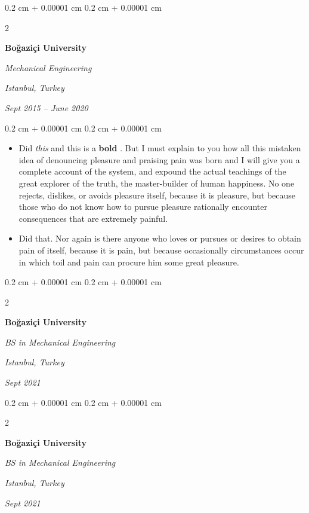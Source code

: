 \documentclass[10pt, letterpaper]{article}
\newenvironment{highlights}{
    \begin{itemize}[
        topsep=0.10 cm,
        parsep=0.10 cm,
        partopsep=0pt,
        itemsep=0pt,
        leftmargin=0.4 cm + 10pt
    ]
}{
    \end{itemize}
} %
\newenvironment{onecolentry}{
    \begin{adjustwidth}{
        0.2 cm + 0.00001 cm
    }{
        0.2 cm + 0.00001 cm
    }
}{
    \end{adjustwidth}
} %
\newenvironment{twocolentry}[2][]{
    \onecolentry
    \def\secondColumn{#2}
    \setcolumnwidth{\fill, 4.5 cm}
    \begin{paracol}{2}
}{
    \switchcolumn \raggedleft \secondColumn
    \end{paracol}
    \endonecolentry
} %
\let\hrefWithoutArrow\href
\renewcommand{\href}[2]{\hrefWithoutArrow{#1}{\ifthenelse{\equal{#2}{}}{ }{#2 }\raisebox{.15ex}{\footnotesize \faExternalLink*}}}
\begin{document}
        \vspace{0.2 cm}

        \begin{twocolentry}{
        \textit{Istanbul, Turkey}    
            
        \textit{Sept 2015 – June 2020}}
            \textbf{Boğaziçi University}

            \textit{Mechanical Engineering}
        \end{twocolentry}

        \vspace{0.10 cm}
        \begin{onecolentry}
            \begin{highlights}
                \item Did \textit{this} and this is a \textbf{bold} \href{https://example.com}{link}. But I must explain to you how all this mistaken idea of denouncing pleasure and praising pain was born and I will give you a complete account of the system, and expound the actual teachings of the great explorer of the truth, the master-builder of human happiness. No one rejects, dislikes, or avoids pleasure itself, because it is pleasure, but because those who do not know how to pursue pleasure rationally encounter consequences that are extremely painful.
                \item Did that. Nor again is there anyone who loves or pursues or desires to obtain pain of itself, because it is pain, but because occasionally circumstances occur in which toil and pain can procure him some great pleasure.
            \end{highlights}
        \end{onecolentry}


        \vspace{0.2 cm}

        \begin{twocolentry}{
        \textit{Istanbul, Turkey}    
            
        \textit{Sept 2021}}
            \textbf{Boğaziçi University}

            \textit{BS in Mechanical Engineering}
        \end{twocolentry}



        \vspace{0.2 cm}

        \begin{twocolentry}{
        \textit{Istanbul, Turkey}    
            
        \textit{Sept 2021}}
            \textbf{Boğaziçi University}

            \textit{BS in Mechanical Engineering}
        \end{twocolentry}
\end{document}
